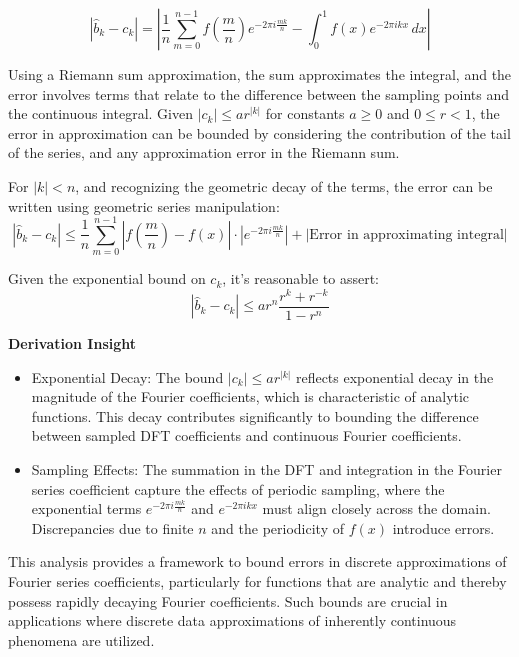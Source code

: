 \documentclass[8pt]{article}
\begin{document}
\[
|\hat{b}_k - c_k| = \left| \frac{1}{n} \sum_{m=0}^{n-1} f\left(\frac{m}{n}\right) e^{-2\pi i \frac{mk}{n}} - \int_0^1 f(x) e^{-2\pi i k x} \, dx \right|
\]

Using a Riemann sum approximation, the sum approximates the integral, and the error involves terms that relate to the difference between the sampling points and the continuous integral. Given \(|c_k| \leq ar^{|k|}\) for constants \(a \geq 0\) and \(0 \leq r < 1\), the error in approximation can be bounded by considering the contribution of the tail of the series, and any approximation error in the Riemann sum.

For \(|k| < n\), and recognizing the geometric decay of the terms, the error can be written using geometric series manipulation:
\[
|\hat{b}_k - c_k| \leq \frac{1}{n} \sum_{m=0}^{n-1} |f\left(\frac{m}{n}\right) - f(x)| \cdot \left|e^{-2\pi i \frac{mk}{n}}\right| + \left| \text{Error in approximating integral} \right|
\]

Given the exponential bound on \(c_k\), it's reasonable to assert:
\[
|\hat{b}_k - c_k| \leq ar^n \frac{r^k + r^{-k}}{1 - r^n}
\]

\textbf{Derivation Insight}

\begin{itemize}
    \item Exponential Decay: The bound \(|c_k| \leq ar^{|k|}\) reflects exponential decay in the magnitude of the Fourier coefficients, which is characteristic of analytic functions. This decay contributes significantly to bounding the difference between sampled DFT coefficients and continuous Fourier coefficients.
    \item Sampling Effects: The summation in the DFT and integration in the Fourier series coefficient capture the effects of periodic sampling, where the exponential terms \(e^{-2\pi i \frac{mk}{n}}\) and \(e^{-2\pi i k x}\) must align closely across the domain. Discrepancies due to finite \(n\) and the periodicity of \(f(x)\) introduce errors.
\end{itemize}

This analysis provides a framework to bound errors in discrete approximations of Fourier series coefficients, particularly for functions that are analytic and thereby possess rapidly decaying Fourier coefficients. Such bounds are crucial in applications where discrete data approximations of inherently continuous phenomena are utilized.
\end{document}
